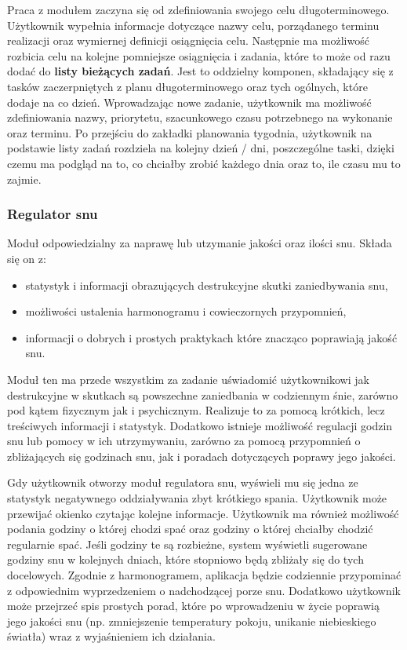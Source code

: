 Praca z modułem zaczyna się od zdefiniowania swojego celu długoterminowego.
Użytkownik wypełnia informacje dotyczące nazwy celu, porządanego terminu
realizacji oraz wymiernej definicji osiągnięcia celu. Następnie ma możliwość
rozbicia celu na kolejne pomniejsze osiągnięcia i zadania, które to może od razu
dodać do \textbf{listy bieżących zadań}. Jest to oddzielny komponen, składający
się z tasków zaczerpniętych z planu długoterminowego oraz tych ogólnych, które
dodaje na co dzień. Wprowadzając nowe zadanie, użytkownik ma możliwość
zdefiniowania nazwy, priorytetu, szacunkowego czasu potrzebnego na wykonanie
oraz terminu. Po przejściu do zakładki planowania tygodnia, użytkownik na
podstawie listy zadań rozdziela na kolejny dzień / dni, poszczególne taski,
dzięki czemu ma podgląd na to, co chciałby zrobić każdego dnia oraz to, ile
czasu mu to zajmie.

\subsubsection*{Regulator snu}
Moduł odpowiedzialny za naprawę lub utzymanie jakości oraz ilości snu. Składa
się on z:
\begin{itemize}
    \item statystyk i informacji obrazujących destrukcyjne skutki zaniedbywania
          snu,
    \item możliwości ustalenia harmonogramu i cowieczornych przypomnień,
    \item informacji o dobrych i prostych praktykach które znacząco poprawiają
          jakość snu.
\end{itemize}
Moduł ten ma przede wszystkim za zadanie uświadomić użytkownikowi jak
destrukcyjne w skutkach są powszechne zaniedbania w codziennym śnie, zarówno pod
kątem fizycznym jak i psychicznym. Realizuje to za pomocą krótkich, lecz
treściwych informacji i statystyk. Dodatkowo istnieje możliwość regulacji godzin
snu lub pomocy w ich utrzymywaniu, zarówno za pomocą przypomnień o zbliżających
się godzinach snu, jak i poradach dotyczących poprawy jego jakości.

Gdy użytkownik otworzy moduł regulatora snu, wyświeli mu się jedna ze statystyk
negatywnego oddziaływania zbyt krótkiego spania. Użytkownik może przewijać
okienko czytając kolejne informacje. Użytkownik ma również możliwość podania
godziny o której chodzi spać oraz godziny o której chciałby chodzić regularnie
spać. Jeśli godziny te są rozbieżne, system wyświetli sugerowane godziny snu w
kolejnych dniach, które stopniowo będą zbliżały się do tych docelowych. Zgodnie
z harmonogramem, aplikacja będzie codziennie przypominać z odpowiednim
wyprzedzeniem o nadchodzącej porze snu. Dodatkowo użytkownik może przejrzeć spis
prostych porad, które po wprowadzeniu w życie poprawią jego jakości snu (np.
zmniejszenie temperatury pokoju, unikanie niebieskiego światła) wraz z
wyjaśnieniem ich działania.

